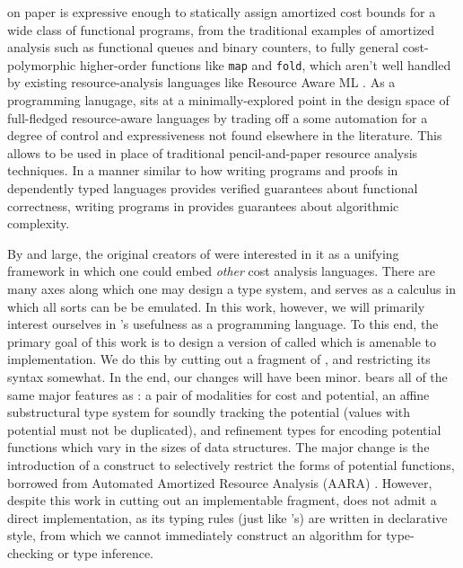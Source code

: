 \lambdaamor on paper is expressive enough to statically assign amortized cost bounds for a wide class of functional programs, from the traditional examples of amortized analysis such as functional queues and binary counters, to fully general cost-polymorphic higher-order functions like \texttt{map} and \texttt{fold}, which aren't well handled by existing resource-analysis languages like Resource Aware ML \cite{hoffmann-et-al:cav12}. As a programming lanugage, \lambdaamor sits at a minimally-explored point in the design space of full-fledged resource-aware languages by trading off a some automation for a degree of control and expressiveness not found elsewhere in the literature. This allows \lambdaamor to be used in place of traditional pencil-and-paper resource analysis techniques. In a manner similar to how writing programs and proofs in dependently typed languages provides verified guarantees about functional correctness, writing programs in \lambdaamor provides guarantees about algorithmic complexity.



By and large, the original creators of \lambdaamor were interested in it as a unifying framework in which one could embed \textit{other} cost analysis languages. There are many axes along which one may design a type system, and \lambdaamor serves as a calculus in which all sorts can be be emulated. In this work, however, we will primarily interest ourselves in \lambdaamor's usefulness as a programming language. To this end, the primary goal of this work is to design a version of \lambdaamor called \dlambdaamor which is amenable to implementation. We do this by cutting out a fragment of \lambdaamor, and restricting its syntax somewhat.
In the end, our changes will have been minor. \dlambdaamor bears all of the same major features as \lambdaamor: a pair of modalities for cost and potential, an affine substructural type system for soundly tracking the potential (values with potential must not be duplicated), and refinement types for encoding potential functions which vary in the sizes of data structures. The major change is the introduction of a construct to selectively restrict the forms of potential functions, borrowed from Automated Amortized Resource Analysis (AARA) \cite{hoffmann-et-al:esop10}. However, despite this work in cutting out an implementable fragment, \dlambdaamor does not admit a direct implementation, as its typing rules (just like \lambdaamor's) are written in declarative style, from which we cannot immediately construct an algorithm for type-checking or type inference. 

